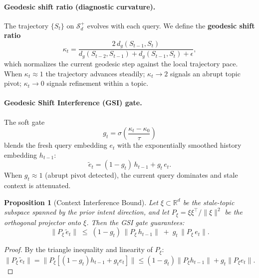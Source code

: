 \documentclass[11pt]{article}
\newtheorem{proposition}{Proposition}
\begin{document}
\paragraph{Geodesic shift ratio (diagnostic curvature).}
The trajectory $\{S_t\}$ on $\mathcal{S}_d^+$ evolves with each query. We define the \textbf{geodesic shift ratio}
\begin{equation}
  \kappa_t = \frac{2\,d_g(S_{t-1},S_t)}{d_g(S_{t-2},S_{t-1}) + d_g(S_{t-1},S_t) + \epsilon},
  \label{eq:gsr}
\end{equation}
which normalizes the current geodesic step against the local trajectory pace. When $\kappa_t \approx 1$ the trajectory advances steadily; $\kappa_t \to 2$ signals an abrupt topic pivot; $\kappa_t \to 0$ signals refinement within a topic.

\paragraph{Geodesic Shift Interference (GSI) gate.}
The soft gate
\begin{equation}
  g_t = \sigma\!\left(\frac{\kappa_t - \kappa_0}{\tau}\right)
  \label{eq:softgate}
\end{equation}
blends the fresh query embedding $e_t$ with the exponentially smoothed history embedding $h_{t-1}$:
\begin{equation}
  \tilde{e}_t = (1 - g_t)\,h_{t-1} + g_t\,e_t.
  \label{eq:gate}
\end{equation}
When $g_t \approx 1$ (abrupt pivot detected), the current query dominates and stale context is attenuated.

\begin{proposition}[Context Interference Bound]
\label{prop:interference_bound}
Let $\xi \subset \mathbb{R}^d$ be the stale-topic subspace spanned by the prior intent direction, and let $P_\xi = \xi\xi^\top / \|\xi\|^2$ be the orthogonal projector onto $\xi$. Then the GSI gate guarantees:
\begin{equation}
  \|P_\xi\,\tilde{e}_t\| \;\leq\; (1-g_t)\,\|P_\xi\,h_{t-1}\| \;+\; g_t\,\|P_\xi\,e_t\|.
  \label{eq:bound}
\end{equation}
\end{proposition}
\begin{proof}
By the triangle inequality and linearity of $P_\xi$:
$\|P_\xi\,\tilde{e}_t\| = \|P_\xi[(1-g_t)h_{t-1} + g_t e_t]\| \leq (1-g_t)\|P_\xi h_{t-1}\| + g_t\|P_\xi e_t\|.$
\end{proof}
\end{document}
